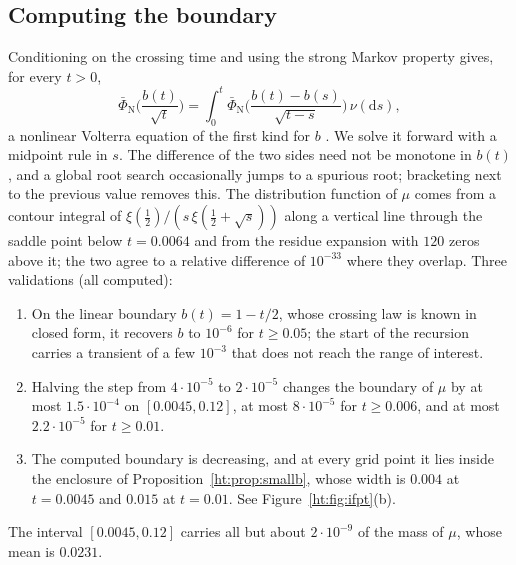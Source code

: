 \subsection{Computing the boundary}
Conditioning on the crossing time and using the strong Markov property gives, for every $t>0$,
\[
\bar\Phi_{\mathrm N}\Big(\frac{b(t)}{\sqrt t}\Big)=\int_0^t\bar\Phi_{\mathrm N}\Big(\frac{b(t)-b(s)}{\sqrt{t-s}}\Big)\,\nu(\mathrm ds),
\]
a nonlinear Volterra equation of the first kind for $b$ \cite{Peskir02}. We solve it forward with a midpoint rule in $s$. The difference of the two sides need not be monotone in $b(t)$, and a global root search occasionally jumps to a spurious root; bracketing next to the previous value removes this. The distribution function of $\mu$ comes from a contour integral of $\xi(\frac12)/(s\,\xi(\frac12+\sqrt s))$ along a vertical line through the saddle point below $t=0.0064$ and from the residue expansion with $120$ zeros above it; the two agree to a relative difference of $10^{-33}$ where they overlap. Three validations (all computed):
\begin{enumerate}
\item On the linear boundary $b(t)=1-t/2$, whose crossing law is known in closed form, it recovers $b$ to $10^{-6}$ for $t\ge0.05$; the start of the recursion carries a transient of a few $10^{-3}$ that does not reach the range of interest.
\item Halving the step from $4\cdot10^{-5}$ to $2\cdot10^{-5}$ changes the boundary of $\mu$ by at most $1.5\cdot10^{-4}$ on $[0.0045,0.12]$, at most $8\cdot10^{-5}$ for $t\ge0.006$, and at most $2.2\cdot10^{-5}$ for $t\ge0.01$.
\item The computed boundary is decreasing, and at every grid point it lies inside the enclosure of Proposition~\ref{ht:prop:smallb}, whose width is $0.004$ at $t=0.0045$ and $0.015$ at $t=0.01$. See Figure~\ref{ht:fig:ifpt}(b).
\end{enumerate}
The interval $[0.0045,0.12]$ carries all but about $2\cdot10^{-9}$ of the mass of $\mu$, whose mean is $0.0231$.

